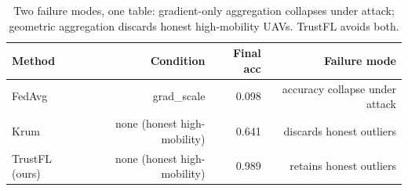 \begin{table}[t]
\centering
\caption{Two failure modes, one table: gradient-only aggregation collapses under attack; geometric aggregation discards honest high-mobility UAVs. TrustFL avoids both.}
\label{tab:motivating}
\begin{tabular}{lrrr}
\toprule
Method & Condition & Final acc & Failure mode \\
\midrule
FedAvg & grad_scale & 0.098 & accuracy collapse under attack \\
Krum & none (honest high-mobility) & 0.641 & discards honest outliers \\
TrustFL (ours) & none (honest high-mobility) & 0.989 & retains honest outliers \\
\bottomrule
\end{tabular}
\end{table}
